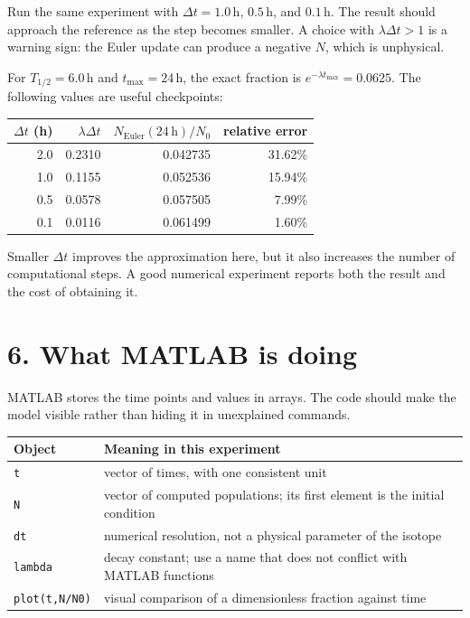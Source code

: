 \documentclass[11pt,a4paper]{article}
\begin{document}
Run the same experiment with $\Delta t=1.0\,\mathrm{h}$, $0.5\,\mathrm{h}$, and $0.1\,\mathrm{h}$. The result should approach the reference as the step becomes smaller. A choice with $\lambda\Delta t>1$ is a warning sign: the Euler update can produce a negative $N$, which is unphysical.

For $T_{1/2}=6.0\,\mathrm{h}$ and $t_{\max}=24\,\mathrm{h}$, the exact fraction is $e^{-\lambda t_{\max}}=0.0625$. The following values are useful checkpoints:
\begin{center}
\small
\begin{tabular}{rrrr}
\toprule
$\Delta t$ (h) & $\lambda\Delta t$ & $N_{\mathrm{Euler}}(24\,\mathrm{h})/N_0$ & relative error\\ \midrule
2.0 & 0.2310 & 0.042735 & 31.62\%\\
1.0 & 0.1155 & 0.052536 & 15.94\%\\
0.5 & 0.0578 & 0.057505 & 7.99\%\\
0.1 & 0.0116 & 0.061499 & 1.60\%\\ \bottomrule
\end{tabular}
\end{center}
Smaller $\Delta t$ improves the approximation here, but it also increases the number of computational steps. A good numerical experiment reports both the result and the cost of obtaining it.

\section*{6. What MATLAB is doing}
MATLAB stores the time points and values in arrays. The code should make the model visible rather than hiding it in unexplained commands.

\begin{center}
\begin{tabular}{>{\raggedright\arraybackslash}p{.28\linewidth}p{.62\linewidth}}
\toprule
\textbf{Object} & \textbf{Meaning in this experiment}\\ \midrule
\texttt{t} & vector of times, with one consistent unit\\
\texttt{N} & vector of computed populations; its first element is the initial condition\\
\texttt{dt} & numerical resolution, not a physical parameter of the isotope\\
\texttt{lambda} & decay constant; use a name that does not conflict with MATLAB functions\\
\texttt{plot(t,N/N0)} & visual comparison of a dimensionless fraction against time\\ \bottomrule
\end{tabular}
\end{center}
\end{document}
